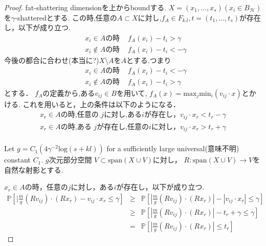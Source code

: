 \documentclass{jarticle}
\begin{document}
\begin{proof}
  fat-shattering dimensionを上からboundする.
  $X=(x_1,\dots,x_s)(x_i \in B_{\mathcal{H}})$を$\gamma$-shatteredとする.
  この時,任意の$A \subset X$に対し,$f_A \in F_{k.l},t=(t_1,\dots,t_s)$が存在し，以下が成り立つ.
  \begin{eqnarray*}
& x_i \in A \mbox{の時 } &f_A(x_i) - t_i > \gamma   \\
&x_i \notin A \mbox{の時 }& f_A(x_i) -t_i < - \gamma
  \end{eqnarray*}
  今後の都合に合わせ(本当に?)$X \setminus A$を$A$とする.つまり
  \begin{eqnarray*}
& x_i \in A \mbox{の時 }  &f_A(x_i) - t_i < - \gamma   \\
& x_i \notin A \mbox{の時 }& f_A(x_i) -t_i > \gamma
  \end{eqnarray*}
とする．
  $f_A$の定義から,ある$v_{ij} \in B$を用いて,
  $f_A(x)=\mathrm{max}_j \mathrm{min}_i(v_{ij} \cdot x) $とかける.
これを用いると，上の条件は以下のようになる．
\begin{eqnarray*}
x_r \in A \mbox{の時,任意の }j\mbox{に対し,ある}i{が存在し，} v_{ij} \cdot x_r  < t_r - \gamma   \\
x_r \in A \mbox{の時,ある }j\mbox{が存在し,任意の}i{に対し，} v_{ij} \cdot x_r  > t_r + \gamma   \\
\end{eqnarray*}

  Let $g= C_1(4\gamma^{-2} \mathrm{log}(s + kl))$
  for a sufficiently large universal(意味不明) constant $C_1$.
$g$次元部分空間 $V \subset \mathrm{span}(X \cup V) $に対し，
$ R : \mathrm{span}(X \cup V) \to V$を自然な射影とする.


$x_r \in A$の時，任意の$j$に対し，ある$i$が存在し，以下が成り立つ.
\begin{eqnarray*}
  \mathbb{P} [ | \frac{m}{g}(Rv_{ij})\cdot (Rx_r) - v_{ij} \cdot  x_r \le  \gamma ]
  & \ge &  \mathbb{P} [ | \frac{m}{g}(Rv_{ij})\cdot (Rx_r)| - |v_{ij} \cdot  x_r| \le  \gamma ] \\
  & \ge &\mathbb{P} [ | \frac{m}{g}(Rv_{ij})\cdot (Rx_r)| - t_r + \gamma  \le  \gamma ] \\
  & = & \mathbb{P} [ | \frac{m}{g}(Rv_{ij})\cdot (Rx_r)| \le t_r  ]
\end{eqnarray*}


\end{proof}
\end{document}
